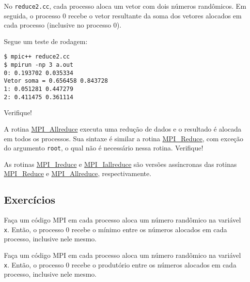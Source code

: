 \begin{ex}
  No \verb+reduce2.cc+, cada processo aloca um vetor com dois números randômicos. Em seguida, o processo $0$ recebe o vetor resultante da soma dos vetores alocados em cada processo (inclusive no processo 0).

  

  Segue um teste de rodagem:
\begin{verbatim}
$ mpic++ reduce2.cc
$ mpirun -np 3 a.out 
0: 0.193702 0.035334
Vetor soma = 0.656458 0.843728
1: 0.051281 0.447279
2: 0.411475 0.361114
\end{verbatim}
  Verifique!
\end{ex}

\begin{obs}
  A rotina \href{https://www.open-mpi.org/doc/current/man3/MPI\_Allreduce.3.php}{MPI\_Allreduce} executa uma redução de dados e o resultado é alocada em todos os processos. Sua sintaxe é similar a rotina \href{https://www.open-mpi.org/doc/current/man3/MPI_Reduce.3.php}{MPI\_Reduce}, com exceção do argumento \verb+root+, o qual não é necessário nessa rotina. Verifique!
\end{obs}

\begin{obs}
  As rotinas \href{https://www.open-mpi.org/doc/current/man3/MPI\_Ireduce.3.php}{MPI\_Ireduce} e \href{https://www.open-mpi.org/doc/current/man3/MPI\_Iallreduce.3.php}{MPI\_Iallreduce} são versões assíncronas das rotinas \href{https://www.open-mpi.org/doc/current/man3/MPI_Reduce.3.php}{MPI\_Reduce} e \href{https://www.open-mpi.org/doc/current/man3/MPI\_Allreduce.3.php}{MPI\_Allreduce}, respectivamente.
\end{obs}

\subsection{Exercícios}

\begin{exer}
  Faça um código MPI em cada processo aloca um número randômico na variável \verb+x+. Então, o processo 0 recebe o mínimo entre os números alocados em cada processo, inclusive nele mesmo.
\end{exer}

\begin{exer}
  Faça um código MPI em cada processo aloca um número randômico na variável \verb+x+. Então, o processo 0 recebe o produtório entre os números alocados em cada processo, inclusive nele mesmo.
\end{exer}


